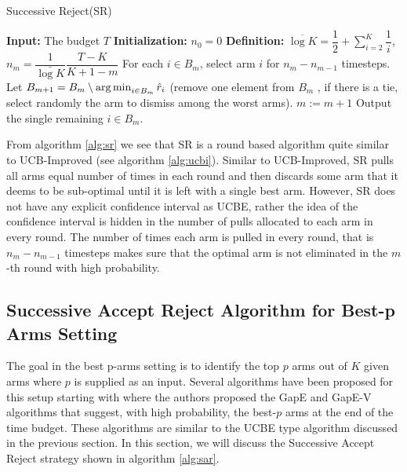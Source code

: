 \begin{algorithm}[!th]
\caption{Successive Reject(SR)}
\label{alg:sr}
\begin{algorithmic}[1]
\State \textbf{Input: } The budget $T$
\State \textbf{Initialization: } $n_0 = 0$
\State \textbf{Definition: } $\overline{\log K} = \dfrac{1}{2} + \sum_{i=2}^{K}\dfrac{1}{i}$, $n_m = \dfrac{1}{\bar{\log K}}\dfrac{T-K}{K + 1 - m}$
\State For each $i \in B_{m}$, select arm $i$ for $n_m - n_{m-1}$ timesteps.
\State Let $B_{m+1} = B_m\setminus \operatorname*{arg\,min}_{i\in B_m} \hat{r}_i$
(remove one element from $B_m$ , if there
is a tie, select randomly the arm to dismiss among the worst arms).
\State $m:=m+1 $
\EndFor
\State Output the single remaining $i\in B_{m}$.
\end{algorithmic}
\end{algorithm}


From algorithm \ref{alg:sr} we see that SR is a round based algorithm quite similar to UCB-Improved (see algorithm \ref{alg:ucbi}). Similar to UCB-Improved, SR pulls all arms equal number of times in each round and then discards some arm that it deems to be sub-optimal until it is left with a single best arm. However, SR does not have any explicit confidence interval as UCBE, rather the idea of the confidence interval is hidden in the number of pulls allocated to each arm in every round. The number of times each arm is pulled in every round, that is $n_m - n_{m-1}$ timesteps makes sure that the optimal arm is not eliminated in the $m$-th round with high probability. 


\subsection{Successive Accept Reject Algorithm for Best-p Arms Setting}

The goal in the best p-arms setting is to identify the top $p$ arms out of $K$ given arms where $p$ is supplied as an input. Several algorithms have been proposed for this setup starting with \citet{gabillon2011multi} where the authors proposed the GapE and GapE-V algorithms that suggest, with high probability, the best-$p$ arms at the end of the time budget. These algorithms are similar to the UCBE type algorithm discussed in the previous section. In this section, we will discuss the Successive Accept Reject strategy shown in algorithm \ref{alg:sar}.


